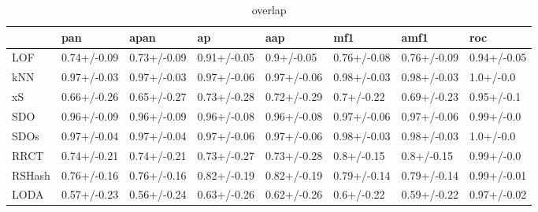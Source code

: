 \begin{table}
\centering
\caption{overlap}
\begin{tabular}{llllllll}
\toprule
{} &          pan &         apan &           ap &          aap &          mf1 &         amf1 &          roc \\
\midrule
LOF    &  0.74+/-0.09 &  0.73+/-0.09 &  0.91+/-0.05 &   0.9+/-0.05 &  0.76+/-0.08 &  0.76+/-0.09 &  0.94+/-0.05 \\
kNN    &  0.97+/-0.03 &  0.97+/-0.03 &  0.97+/-0.06 &  0.97+/-0.06 &  0.98+/-0.03 &  0.98+/-0.03 &    1.0+/-0.0 \\
xS     &  0.66+/-0.26 &  0.65+/-0.27 &  0.73+/-0.28 &  0.72+/-0.29 &   0.7+/-0.22 &  0.69+/-0.23 &   0.95+/-0.1 \\
SDO    &  0.96+/-0.09 &  0.96+/-0.09 &  0.96+/-0.08 &  0.96+/-0.08 &  0.97+/-0.06 &  0.97+/-0.06 &   0.99+/-0.0 \\
SDOs   &  0.97+/-0.04 &  0.97+/-0.04 &  0.97+/-0.06 &  0.97+/-0.06 &  0.98+/-0.03 &  0.98+/-0.03 &    1.0+/-0.0 \\
RRCT   &  0.74+/-0.21 &  0.74+/-0.21 &  0.73+/-0.27 &  0.73+/-0.28 &   0.8+/-0.15 &   0.8+/-0.15 &   0.99+/-0.0 \\
RSHash &  0.76+/-0.16 &  0.76+/-0.16 &  0.82+/-0.19 &  0.82+/-0.19 &  0.79+/-0.14 &  0.79+/-0.14 &  0.99+/-0.01 \\
LODA   &  0.57+/-0.23 &  0.56+/-0.24 &  0.63+/-0.26 &  0.62+/-0.26 &   0.6+/-0.22 &  0.59+/-0.22 &  0.97+/-0.02 \\
\bottomrule
\end{tabular}
\end{table}
